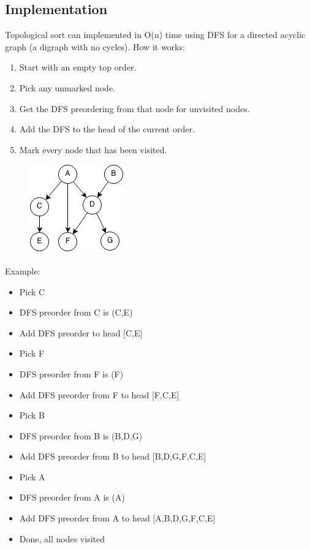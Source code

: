 \documentclass[11pt,oneside]{book}
\makeatletter
\def\maxwidth#1{\ifdim\Gin@nat@width>#1 #1\else\Gin@nat@width\fi}
\makeatother
\begin{document}
\subsection{Implementation}

Topological sort can implemented in O(n) time using DFS for a directed acyclic graph (a digraph with no cycles). How it works:

\begin{enumerate}
\item Start with an empty top order.
\item Pick any unmarked node.
\item Get the DFS preordering from that node for unvisited nodes.
\item Add the DFS to the head of the current order.
\item Mark every node that has been visited.
\end{enumerate}

\vspace{5px}\begin{figure}[H]\centering
        \includegraphics[width=0.66\maxwidth{\textwidth}]{topsort.png}
        \end{figure}

Example:

\begin{itemize}
\item Pick C
\item DFS preorder from C is (C,E)
\item Add DFS preorder to head [C,E]
\item Pick F
\item DFS preorder from F is (F)
\item Add DFS preorder from F to head [F,C,E]
\item Pick B
\item DFS preorder from B is (B,D,G)
\item Add DFS preorder from B to head [B,D,G,F,C,E]
\item Pick A
\item DFS preorder from A is (A)
\item Add DFS preorder from A to head [A,B,D,G,F,C,E]
\item Done, all nodes visited
\end{itemize}
\end{document}
